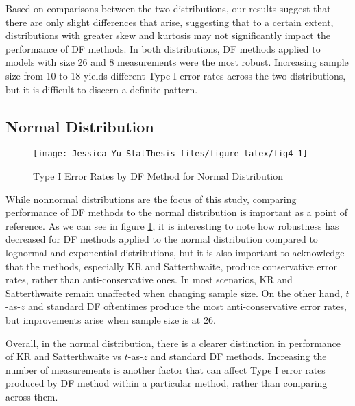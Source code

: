 \documentclass[12pt, twoside]{amherstthesis}
\begin{document}
Based on comparisons between the two distributions, our results suggest that there are only slight differences that arise, suggesting that to a certain extent, distributions with greater skew and kurtosis may not significantly impact the performance of DF methods. In both distributions, DF methods applied to models with size 26 and 8 measurements were the most robust. Increasing sample size from 10 to 18 yields different Type I error rates across the two distributions, but it is difficult to discern a definite pattern.

\hypertarget{normal-distribution}{%
\subsection{Normal Distribution}\label{normal-distribution}}
\begin{figure}

{\centering \texttt{[image: Jessica-Yu\_StatThesis\_files/figure-latex/fig4-1]} 

}

\caption{Type I Error Rates by DF Method for Normal Distribution}\label{fig:fig4}
\end{figure}
While nonnormal distributions are the focus of this study, comparing performance of DF methods to the normal distribution is important as a point of reference. As we can see in figure \ref{fig:fig4}, it is interesting to note how robustness has decreased for DF methods applied to the normal distribution compared to lognormal and exponential distributions, but it is also important to acknowledge that the methods, especially KR and Satterthwaite, produce conservative error rates, rather than anti-conservative ones. In most scenarios, KR and Satterthwaite remain unaffected when changing sample size. On the other hand, \(t\)-as-\(z\) and standard DF oftentimes produce the most anti-conservative error rates, but improvements arise when sample size is at 26.

Overall, in the normal distribution, there is a clearer distinction in performance of KR and Satterthwaite vs \(t\)-as-\(z\) and standard DF methods. Increasing the number of measurements is another factor that can affect Type I error rates produced by DF method within a particular method, rather than comparing across them.
\end{document}

